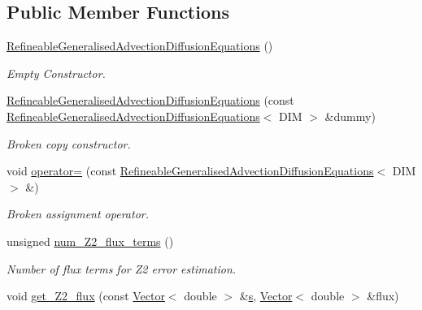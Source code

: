 \subsection*{Public Member Functions}
\begin{DoxyCompactItemize}
\item 
\hyperlink{classoomph_1_1RefineableGeneralisedAdvectionDiffusionEquations_aaf60df44fee48a9cc07f7f7cefa4f29c}{Refineable\+Generalised\+Advection\+Diffusion\+Equations} ()
\begin{DoxyCompactList}\small\item\em Empty Constructor. \end{DoxyCompactList}\item 
\hyperlink{classoomph_1_1RefineableGeneralisedAdvectionDiffusionEquations_a5b33255a668fd423f26598047d2cb7b9}{Refineable\+Generalised\+Advection\+Diffusion\+Equations} (const \hyperlink{classoomph_1_1RefineableGeneralisedAdvectionDiffusionEquations}{Refineable\+Generalised\+Advection\+Diffusion\+Equations}$<$ D\+IM $>$ \&dummy)
\begin{DoxyCompactList}\small\item\em Broken copy constructor. \end{DoxyCompactList}\item 
void \hyperlink{classoomph_1_1RefineableGeneralisedAdvectionDiffusionEquations_a37d21f46a5f0b726349b42bb0d47b35e}{operator=} (const \hyperlink{classoomph_1_1RefineableGeneralisedAdvectionDiffusionEquations}{Refineable\+Generalised\+Advection\+Diffusion\+Equations}$<$ D\+IM $>$ \&)
\begin{DoxyCompactList}\small\item\em Broken assignment operator. \end{DoxyCompactList}\item 
unsigned \hyperlink{classoomph_1_1RefineableGeneralisedAdvectionDiffusionEquations_acfd093a30da3a18eb1d86f24b48ab594}{num\+\_\+\+Z2\+\_\+flux\+\_\+terms} ()
\begin{DoxyCompactList}\small\item\em Number of \textquotesingle{}flux\textquotesingle{} terms for Z2 error estimation. \end{DoxyCompactList}\item 
void \hyperlink{classoomph_1_1RefineableGeneralisedAdvectionDiffusionEquations_a097fa9a13ecaebe0c3801c98a057d5ec}{get\+\_\+\+Z2\+\_\+flux} (const \hyperlink{classoomph_1_1Vector}{Vector}$<$ double $>$ \&\hyperlink{cfortran_8h_ab7123126e4885ef647dd9c6e3807a21c}{s}, \hyperlink{classoomph_1_1Vector}{Vector}$<$ double $>$ \&flux)

\end{DoxyCompactItemize}
